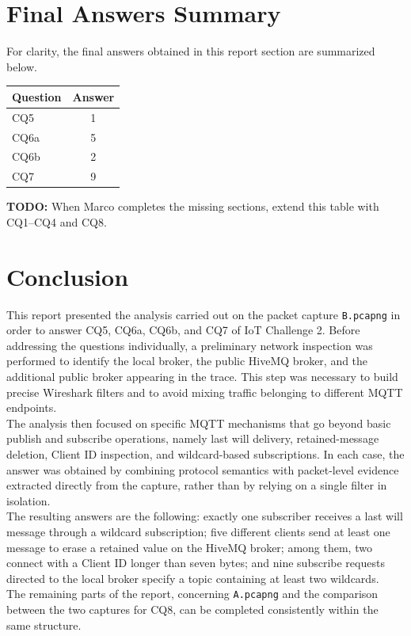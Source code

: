 \documentclass[a4paper,11pt]{article}
\newcommand{\TODO}[1]{
\begin{todobox}
\textbf{TODO:} #1
\end{todobox}
}
\begin{document}
\section{Final Answers Summary}

For clarity, the final answers obtained in this report section are summarized below.

\begin{center}
\begin{tabular}{lc}
\toprule
\textbf{Question} & \textbf{Answer} \\
\midrule
CQ5  & 1 \\
CQ6a & 5 \\
CQ6b & 2 \\
CQ7  & 9 \\
\bottomrule
\end{tabular}
\end{center}

\TODO{When Marco completes the missing sections, extend this table with CQ1--CQ4 and CQ8.}

\section{Conclusion}

This report presented the analysis carried out on the packet capture
\texttt{B.pcapng} in order to answer CQ5, CQ6a, CQ6b, and CQ7 of IoT Challenge 2.
Before addressing the questions individually, a preliminary network inspection was
performed to identify the local broker, the public HiveMQ broker, and the additional
public broker appearing in the trace. This step was necessary to build precise
Wireshark filters and to avoid mixing traffic belonging to different MQTT endpoints.\\

The analysis then focused on specific MQTT mechanisms that go beyond basic publish and
subscribe operations, namely last will delivery, retained-message deletion, Client ID
inspection, and wildcard-based subscriptions. In each case, the answer was obtained by
combining protocol semantics with packet-level evidence extracted directly from the
capture, rather than by relying on a single filter in isolation.\\

The resulting answers are the following: exactly one subscriber receives a last will
message through a wildcard subscription; five different clients send at least one
message to erase a retained value on the HiveMQ broker; among them, two connect with a
Client ID longer than seven bytes; and nine subscribe requests directed to the local
broker specify a topic containing at least two wildcards.\\

The remaining parts of the report, concerning \texttt{A.pcapng} and the comparison
between the two captures for CQ8, can be completed consistently within the same
structure.
\end{document}
